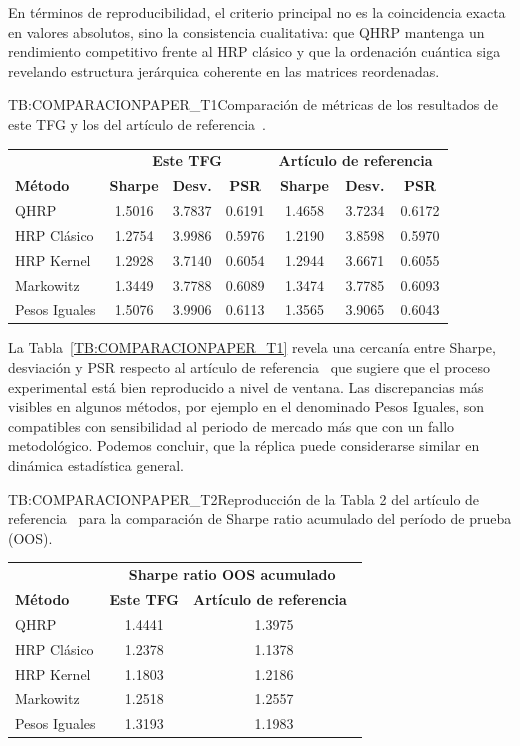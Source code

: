 En términos de reproducibilidad, el criterio principal no es la coincidencia exacta en valores absolutos, sino la consistencia cualitativa: que \gls{QHRP} mantenga un rendimiento competitivo frente al \gls{HRP} clásico y que la ordenación cuántica siga revelando estructura jerárquica coherente en las matrices reordenadas.

\begin{table}[Comparación con el artículo de referencia (Tabla 1)]{TB:COMPARACIONPAPER_T1}{Comparación de métricas de los resultados de este TFG y los del artículo de referencia~\cite{arian2025qhrp}.}
\begin{tabular}{lcccccc}
\hline
 & \multicolumn{3}{c}{\textbf{Este TFG}} & \multicolumn{3}{c}{\textbf{Artículo de referencia~\cite{arian2025qhrp}}} \\
\textbf{Método} & \textbf{Sharpe} & \textbf{Desv.} & \textbf{PSR} & \textbf{Sharpe} & \textbf{Desv.} & \textbf{PSR} \\
\hline
QHRP & 1.5016 & 3.7837 & 0.6191 & 1.4658 & 3.7234 & 0.6172 \\
HRP Clásico & 1.2754 & 3.9986 & 0.5976 & 1.2190 & 3.8598 & 0.5970 \\
HRP Kernel & 1.2928 & 3.7140 & 0.6054 & 1.2944 & 3.6671 & 0.6055 \\
Markowitz & 1.3449 & 3.7788 & 0.6089 & 1.3474 & 3.7785 & 0.6093 \\
Pesos Iguales & 1.5076 & 3.9906 & 0.6113 & 1.3565 & 3.9065 & 0.6043 \\
\hline
\end{tabular}
\end{table}

La Tabla~\ref{TB:COMPARACIONPAPER_T1} revela una cercanía entre Sharpe, desviación y PSR respecto al artículo de referencia~\cite{arian2025qhrp} que sugiere que el proceso experimental está bien reproducido a nivel de ventana. Las discrepancias más visibles en algunos métodos, por ejemplo en el denominado Pesos Iguales, son compatibles con sensibilidad al periodo de mercado más que con un fallo metodológico. Podemos concluir, que la réplica puede considerarse similar en dinámica estadística general.

\begin{table}[Comparación con el artículo de referencia (Tabla 2)]{TB:COMPARACIONPAPER_T2}{Reproducción de la Tabla 2 del artículo de referencia~\cite{arian2025qhrp} para la comparación de Sharpe ratio acumulado del período de prueba (OOS).}
\begin{tabular}{lcc}
\hline
 & \multicolumn{2}{c}{\textbf{Sharpe ratio \gls{OOS} acumulado}} \\
\textbf{Método} & \textbf{Este TFG} & \textbf{Artículo de referencia~\cite{arian2025qhrp}} \\
\hline
QHRP & 1.4441 & 1.3975 \\
HRP Clásico & 1.2378 & 1.1378 \\
HRP Kernel & 1.1803 & 1.2186 \\
Markowitz & 1.2518 & 1.2557 \\
Pesos Iguales & 1.3193 & 1.1983 \\
\hline
\end{tabular}
\end{table}

